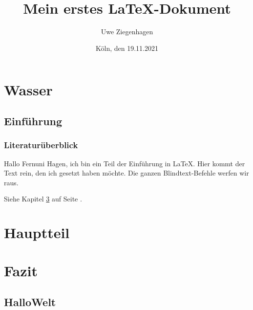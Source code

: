 \documentclass[12pt,ngerman,parskip=full]{scrreprt}
\author{Uwe Ziegenhagen}
\title{Mein erstes \LaTeX-Dokument}
\date{Köln, den 19.11.2021}
\begin{document}
\maketitle

\tableofcontents

\chapter{Wasser}

\section{Einführung}
\subsection{Literaturüberblick}

Hallo Fernuni Hagen, ich bin ein Teil der Einführung in \LaTeX. Hier kommt der Text rein, den ich gesetzt haben möchte. Die ganzen Blindtext-Befehle werfen wir raus.

Siehe Kapitel \ref{cha:fazit} auf Seite \pageref{cha:fazit}.

\chapter{Hauptteil}\label{cha:hauptteil}

\blindtext[200]  

\blindtext[200]  

\blindtext[200]  

\chapter{Fazit}\label{cha:fazit}

\section{HalloWelt}\label{sec:hallo}

\blindtext[2]  

\blindtext[2]  

\blindtext[2]  
\end{document}
